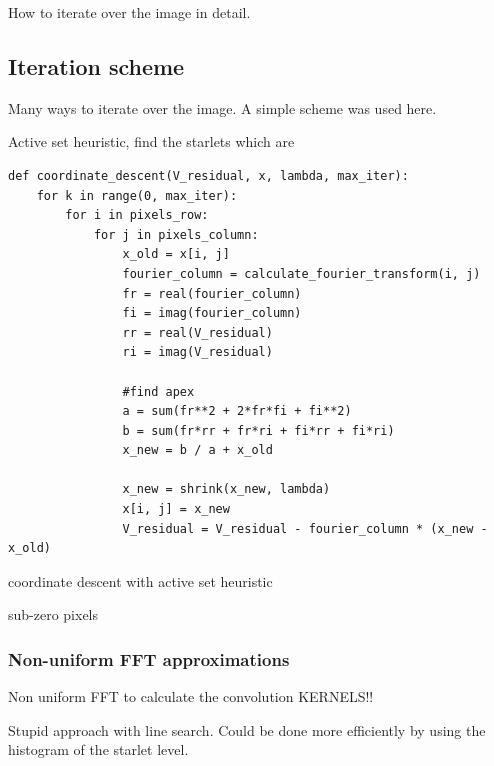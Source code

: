 How to iterate over the image in detail.



\subsection{Iteration scheme}
Many ways to iterate over the image. A simple scheme was used here. 

Active set heuristic, find the starlets which are 

\begin{lstlisting} 
def coordinate_descent(V_residual, x, lambda, max_iter):
	for k in range(0, max_iter):
		for i in pixels_row:
			for j in pixels_column:
				x_old = x[i, j]
				fourier_column = calculate_fourier_transform(i, j)
				fr = real(fourier_column)
				fi = imag(fourier_column)
				rr = real(V_residual)
				ri = imag(V_residual)
				
				#find apex
				a = sum(fr**2 + 2*fr*fi + fi**2)
				b = sum(fr*rr + fr*ri + fi*rr + fi*ri)
				x_new = b / a + x_old
				
				x_new = shrink(x_new, lambda)
				x[i, j] = x_new
				V_residual = V_residual - fourier_column * (x_new - x_old)
\end{lstlisting}\label{cd:implementation}

coordinate descent with active set heuristic


sub-zero pixels

\subsubsection{Non-uniform FFT approximations}
Non uniform FFT to calculate the convolution KERNELS!!


Stupid approach with line search. Could be done more efficiently by using the histogram of the starlet level.

